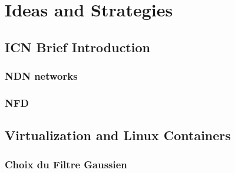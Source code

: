 \documentclass[8pt]{beamer}
\newcommand{\1}{\mathbbm 1}
\begin{document}
\section{Ideas and Strategies}

\subsection{ICN Brief Introduction}

\subsubsection{NDN networks}


\subsubsection{NFD}


\subsection{Virtualization and Linux Containers}

\subsubsection{Choix du Filtre Gaussien}
\end{document}
